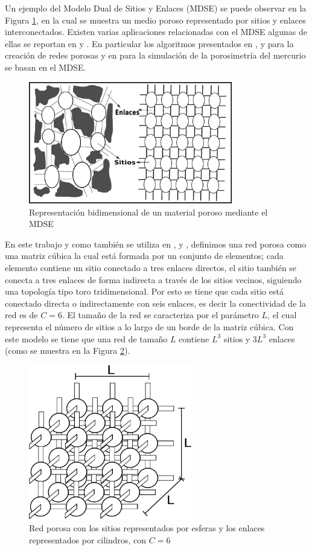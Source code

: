 Un ejemplo del Modelo Dual de Sitios y Enlaces (MDSE) se puede observar en la Figura \ref{fig:dbsm}, en la cual se muestra un medio poroso representado por sitios y enlaces interconectados. Existen varias aplicaciones relacionadas con el MDSE algunas de ellas se reportan en \cite{ref8} y \cite{ref10}. En particular los algoritmos presentados en \cite{ref2}, \cite{ref3} y \cite{ref4} para la creación de redes porosas y en \cite{ref7} para la simulación de la porosimetría del mercurio se basan en el MDSE.\\

\begin{figure}[hbtp]
\centering
\includegraphics[width=3.5in]{img/dsbm_es.pdf}
\caption{Representación bidimensional de un material poroso mediante el MDSE}
\label{fig:dbsm}
\end{figure}

En este trabajo y como también se utiliza en \cite{ref2}, \cite{ref3} y \cite{ref4}, definimos una red porosa como una matriz cúbica la cual está formada por un conjunto de elementos; cada elemento contiene un sitio conectado a tres enlaces directos, el sitio también se conecta a tres enlaces de forma indirecta a través de los sitios vecinos, siguiendo una topología tipo toro tridimensional. Por esto se tiene que cada sitio está conectado directa o indirectamente con seis enlaces, es decir la conectividad de la red es de $C=6$. El tamaño de la red se caracteriza por el parámetro $L$, el cual representa el número de sitios a lo largo de un borde de la matriz cúbica. Con este modelo se tiene que una red de tamaño $L$ contiene $L^3$ sitios y $3L^3$ enlaces (como se muestra en la Figura \ref{fig:lattice3d}).

\begin{figure}[hbtp]
\centering
\includegraphics[width=2.8in]{img/red.pdf}
\caption{Red porosa con los sitios representados por esferas y los enlaces representados por cilindros, con $C=6$}
\label{fig:lattice3d}
\end{figure}
 

